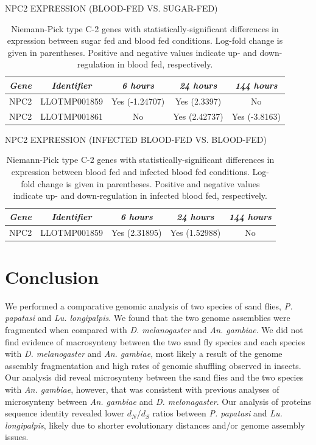 \begin{table}[H]
  \centering
  \caption{NPC2 EXPRESSION (BLOOD-FED VS. SUGAR-FED)}
  \begin{tabular}{ c c c c c } \hline
    \emph{Gene} & \emph{Identifier} & \emph{6 hours} & \emph{24 hours} & \emph{144 hours} \\ \hline
    NPC2 & LLOTMP001859 & Yes (-1.24707) & Yes (2.3397) & No \\
    NPC2 & LLOTMP001861 & No & Yes (2.42737) & Yes (-3.8163)
  \end{tabular}
  \caption*{Niemann-Pick type C-2 genes with statistically-significant differences in expression between sugar fed and blood fed conditions. Log-fold change is given in parentheses. Positive and negative values indicate up- and down-regulation in blood fed, respectively.}
  \label{tab:sandflies:stat-sig-npc2-sb}
\end{table}

\begin{table}[H]
  \centering
  \caption{NPC2 EXPRESSION (INFECTED BLOOD-FED VS. BLOOD-FED)}
  \begin{tabular}{ c c c c c } \hline
    \emph{Gene} & \emph{Identifier} & \emph{6 hours} & \emph{24 hours} & \emph{144 hours} \\ \hline
    NPC2 & LLOTMP001859 & Yes (2.31895) & Yes (1.52988) & No
  \end{tabular}
  \caption*{Niemann-Pick type C-2 genes with statistically-significant differences in expression between blood fed and infected blood fed conditions. Log-fold change is given in parentheses. Positive and negative values indicate up- and down-regulation in infected blood fed, respectively.}
  \label{tab:sandflies:stat-sig-npc2-bi}
\end{table}


\section{Conclusion}
We performed a comparative genomic analysis of two species of sand flies, \emph{P. papatasi} and \emph{Lu. longipalpis}.  We found that the two genome assemblies were fragmented when compared with \emph{D. melanogaster} and \emph{An. gambiae}.  We did not find evidence of macrosynteny between the two sand fly species and each species with \emph{D. melanogaster} and \emph{An. gambiae}, most likely a result of the genome assembly fragmentation and high rates of genomic shuffling observed in insects.  Our analysis did reveal microsynteny between the sand flies and the two species with \emph{An. gambiae}, however, that was consistent with previous analyses of microsynteny between \emph{An. gambiae} and \emph{D. melonagaster}.  Our analysis of proteins sequence identity revealed lower $d_N$/$d_S$ ratios between \emph{P. papatasi} and \emph{Lu. longipalpis}, likely due to shorter evolutionary distances and/or genome assembly issues.

